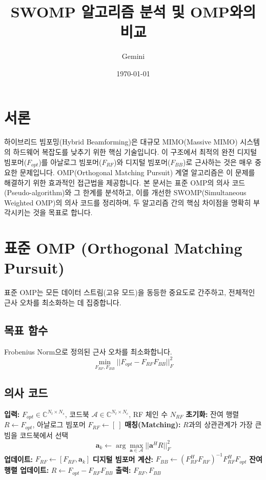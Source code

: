 \documentclass[10pt]{article}
\title{\textbf{SWOMP 알고리즘 분석 및 OMP와의 비교}}
\author{Gemini}
\date{\today}
\begin{document}
\maketitle

\section{서론}
하이브리드 빔포밍(Hybrid Beamforming)은 대규모 MIMO(Massive MIMO) 시스템의 하드웨어 복잡도를 낮추기 위한 핵심 기술입니다. 이 구조에서 최적의 완전 디지털 빔포머($F_{opt}$)를 아날로그 빔포머($F_{RF}$)와 디지털 빔포머($F_{BB}$)로 근사하는 것은 매우 중요한 문제입니다. OMP(Orthogonal Matching Pursuit) 계열 알고리즘은 이 문제를 해결하기 위한 효과적인 접근법을 제공합니다. 본 문서는 표준 OMP의 의사 코드(Pseudo-algorithm)와 그 한계를 분석하고, 이를 개선한 SWOMP(Simultaneous Weighted OMP)의 의사 코드를 정리하며, 두 알고리즘 간의 핵심 차이점을 명확히 부각시키는 것을 목표로 합니다.

\section{표준 OMP (Orthogonal Matching Pursuit)}
표준 OMP는 모든 데이터 스트림(고유 모드)을 동등한 중요도로 간주하고, 전체적인 근사 오차를 최소화하는 데 집중합니다.

\subsection{목표 함수}
Frobenius Norm으로 정의된 근사 오차를 최소화합니다.
\begin{equation}
    \min_{F_{RF}, F_{BB}} ||F_{opt} - F_{RF}F_{BB}||_F^2
\end{equation}

\subsection{의사 코드}
\begin{algorithm}[H]
    \caption{Standard OMP for Hybrid Beamforming}
    \begin{algorithmic}[1]
        \State \textbf{입력:} $F_{opt} \in \mathbb{C}^{N_t \times N_s}$, 코드북 $\mathcal{A} \in \mathbb{C}^{N_t \times N_c}$, RF 체인 수 $N_{RF}$
        \State \textbf{초기화:} 잔여 행렬 $R \gets F_{opt}$, 아날로그 빔포머 $F_{RF} \gets [\ ]$
            \State \textbf{매칭(Matching):} $R$과의 상관관계가 가장 큰 빔을 코드북에서 선택
            \begin{equation*}
                \mathbf{a}_k \gets \arg\max_{\mathbf{a} \in \mathcal{A}} ||\mathbf{a}^H R||_F^2
            \end{equation*}
            \State \textbf{업데이트:} $F_{RF} \gets [F_{RF}, \mathbf{a}_k]$
            \State \textbf{디지털 빔포머 계산:} $F_{BB} \gets (F_{RF}^H F_{RF})^{-1} F_{RF}^H F_{opt}$
            \State \textbf{잔여 행렬 업데이트:} $R \gets F_{opt} - F_{RF}F_{BB}$
        \EndFor
        \State \textbf{출력:} $F_{RF}, F_{BB}$
    \end{algorithmic}
\end{algorithm}
\end{document}
